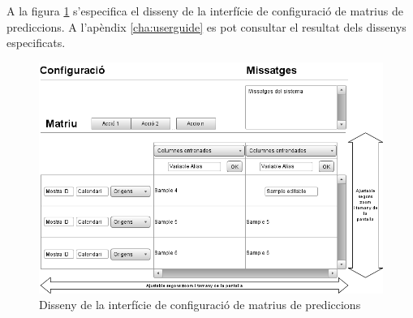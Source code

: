 A la figura \ref{fig:interfacematrixpredictionconf} s'especifica el disseny de la interfície de configuraci\'{o} de matrius de prediccions. A l'apèndix \ref{cha:userguide} es pot consultar el resultat dels dissenys especificats.

\begin{figure}[H]
  \centering
  \includegraphics[scale=0.5]{img/design/Interficiedeconfiguraciopredi.png}
  \caption{Disseny de la interfície de configuració de matrius de prediccions}
  \label{fig:interfacematrixpredictionconf}
\end{figure}
